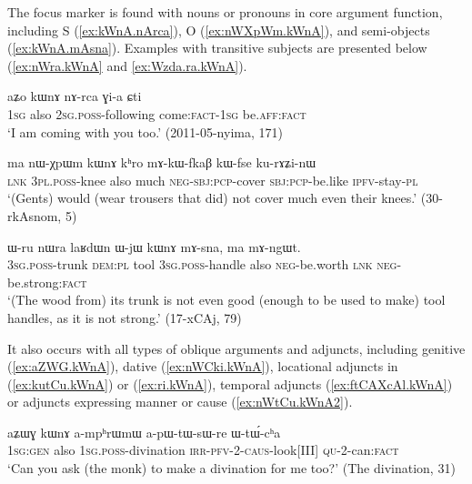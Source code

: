 The focus marker  is found with nouns or pronouns in core argument function, including S (\ref{ex:kWnA.nArca}), O (\ref{ex:nWXpWm.kWnA}), and semi-objects (\ref{ex:kWnA.mAsna}).  Examples with transitive subjects are presented below (\ref{ex:nWra.kWnA} and \ref{ex:Wzda.ra.kWnA}).

 \begin{exe}
\ex \label{ex:kWnA.nArca}
\gll aʑo kɯnɤ nɤ-rca ɣi-a ɕti  \\
\textsc{1sg} also \textsc{2sg}.\textsc{poss}-following come:\textsc{fact}-\textsc{1sg} be.\textsc{aff}:\textsc{fact} \\
\glt `I am coming with you too.' (2011-05-nyima, 171)
 \end{exe}
 
   \begin{exe}
\ex \label{ex:nWXpWm.kWnA}
\gll    ma nɯ-χpɯm kɯnɤ kʰro mɤ-kɯ-fkaβ kɯ-fse ku-rɤʑi-nɯ  \\
\textsc{lnk} \textsc{3pl}.\textsc{poss}-knee also much \textsc{neg}-\textsc{sbj}:\textsc{pcp}-cover \textsc{sbj}:\textsc{pcp}-be.like \textsc{ipfv}-stay-\textsc{pl} \\
\glt `(Gents) would (wear trousers that did) not cover much even their knees.'  (30-rkAsnom, 5) 
  \end{exe}
  
  \begin{exe}
 \ex \label{ex:kWnA.mAsna}
 \gll   ɯ-ru nɯra laʁdɯn ɯ-jɯ kɯnɤ mɤ-sna, ma mɤ-ngɯt. \\
 \textsc{3sg}.\textsc{poss}-trunk \textsc{dem}:\textsc{pl} tool \textsc{3sg}.\textsc{poss}-handle also \textsc{neg}-be.worth \textsc{lnk}  \textsc{neg}-be.strong:\textsc{fact} \\
 \glt `(The wood from) its trunk is not even good (enough to be used to make) tool handles, as it is not strong.'  (17-xCAj, 79)
  \end{exe}

It also occurs with all types of oblique arguments and adjuncts, including genitive  (\ref{ex:aZWG.kWnA}), dative  (\ref{ex:nWCki.kWnA}),  locational adjuncts in  (\ref{ex:kutCu.kWnA}) or  (\ref{ex:ri.kWnA}), temporal adjuncts (\ref{ex:ftCAXcAl.kWnA}) or adjuncts expressing manner or cause (\ref{ex:nWtCu.kWnA2}).  
  
   \begin{exe}
\ex \label{ex:aZWG.kWnA}
\gll aʑɯɣ kɯnɤ a-mpʰrɯmɯ a-pɯ-tɯ-sɯ-re ɯ-tɯ́-cʰa \\
\textsc{1sg}:\textsc{gen} also \textsc{1sg}.\textsc{poss}-divination \textsc{irr}-\textsc{pfv}-2-\textsc{caus}-look[III] \textsc{qu}-2-can:\textsc{fact} \\
\glt `Can you ask (the monk) to make a divination for me too?' (The divination, 31)
\end{exe}  
  
